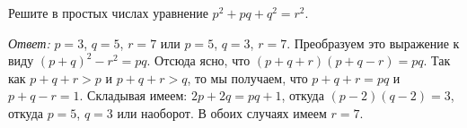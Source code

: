 \problem
Решите в простых числах уравнение $p^2 + p q + q^2 = r^2$.

\solution
\emph{Ответ:} $p = 3$, $q = 5$, $r = 7$ или $p = 5$, $q = 3$, $r = 7$.
Преобразуем это выражение к виду $(p + q)^2 - r^2 = p q$.
Отсюда ясно, что $(p + q + r) (p + q - r) = p q$.
Так как $p + q + r > p$ и $p + q + r > q$, то мы получаем, что $p + q + r = p q$
и $p + q - r = 1$.
Складывая имеем: $2 p + 2 q = p q + 1$, откуда $(p - 2) (q - 2) = 3$, откуда
$p = 5$, $q = 3$ или наоборот.
В обоих случаях имеем $r = 7$.

\endproblem

